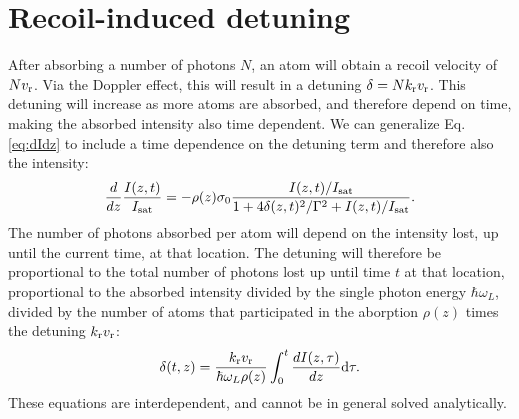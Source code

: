 

\section{Recoil-induced detuning}

After absorbing a number of photons $N$, an atom will obtain a recoil velocity of $N v_{\rm{r}}$. Via the Doppler effect, this will result in a detuning $\delta=N k_{\rm{r}} v_{\rm{r}}$. This detuning will increase as more atoms are absorbed, and therefore depend on time, making the absorbed intensity also time dependent. We can generalize Eq. \ref{eq:dIdz} to include a time dependence on the detuning term and therefore also the intensity: 
\begin{equation}
\frac{d}{dz}\frac{I(z,t)}{I_{\rm{sat}}}=-\rho(z)\sigma_0\frac{I(z,t)/I_{\rm{sat}}}{1+4\delta(z,t)^2 /\Gamma^2+I(z,t)/I_{\rm{sat}}}. \label{eq3}
\end{equation}
The number of photons absorbed per atom will depend on the intensity lost, up until the current time, at that location. The detuning will therefore be proportional to the total number of photons lost up until time $t$ at that location, proportional to the absorbed intensity divided by the single photon energy $\hbar\omega_L$, divided by the number of atoms that participated in the aborption $\rho(z)$ times the detuning $ k_{\rm{r}} v_{\rm{r}}$:
\begin{equation}
\delta(t,z)=\frac{ k_{\rm{r}} v_{\rm{r}}}{\hbar\omega_L\rho(z)}\int_0^t\frac{dI(z,\tau)}{dz}\mathrm{d}\tau.
\label{eq4}
\end{equation}
These equations are interdependent, and cannot be in general solved analytically. 

